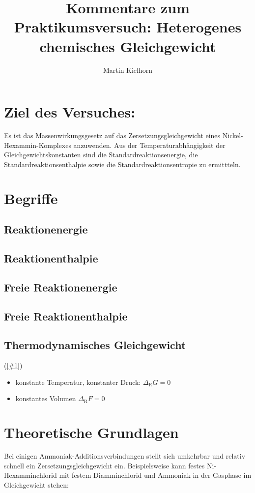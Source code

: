 \documentclass[ngerman,twocolumn,DIV21,a4,10pt]{scrartcl}
\begin{document}
\title{Kommentare zum Praktikumsversuch: Heterogenes chemisches Gleichgewicht}
\author{Martin Kielhorn}
\maketitle
\section{Ziel des Versuches:}
Es ist das Massenwirkungsgesetz auf das Zersetzungsgleichgewicht eines
Nickel-Hexammin-Komplexes anzuwenden. Aus der Temperaturabhängigkeit
der Gleichgewichtskonstanten sind die Standardreaktionsenergie, die
Standardreaktionsenthalpie sowie die Standardreaktionsentropie zu
ermittteln.
\section{Begriffe}

\printnomenclature
\subsection{Reaktionenergie}
\subsection{Reaktionenthalpie}
\subsection{Freie Reaktionenergie}
\subsection{Freie Reaktionenthalpie}
\subsection{Thermodynamisches Gleichgewicht}
\newcommand{\dr}{\Delta_\textrm{R}}
\newcommand{\eqref}{1}{(\ref{#1})}
\newcommand{\dc}{{}^\circ\textrm{C}}
\begin{itemize}
\item konstante Temperatur, konstanter Druck: $\dr G = 0$
\item konstantes Volumen $\dr F = 0$
\end{itemize}
\section{Theoretische Grundlagen}
Bei einigen Ammoniak-Additionsverbindungen stellt sich umkehrbar und
relativ schnell ein Zersetzungsgleichgewicht ein. Beispielsweise kann
festes Ni-Hexamminchlorid mit festem Diamminchlorid und Ammoniak in
der Gasphase im Gleichgewicht stehen:
\end{document}
